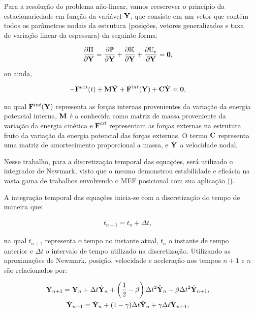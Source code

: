 Para a resolução do problema não-linear, vamos reescrever o princípio da estacionariedade em função da variável $\mathbf{Y}$, que consiste em um vetor que contém todos os parâmetros nodais da estrutura (posições, vetores generalizados e taxa de variação linear da espessura) da seguinte forma:

\begin{align}
	\frac{\partial\Pi}{\partial\mathbf{Y}} = \frac{\partial\mathbb{P}}{\partial \mathbf{Y}} + \frac{\partial\mathbb{K}}{\partial \mathbf{Y}} + \frac{\partial\mathbb{U}_e}{\partial \mathbf{Y}} = \mathbf{0},
\end{align}

\noindent ou ainda,

\begin{align}
	- \mathbf{F}^{ext}(t) + \mathbf{M}\ddot{\mathbf{Y}}_{}+ \mathbf{F}^{int}(\mathbf{Y}) + \mathbf{C}\dot{\mathbf{Y}}_{} = \mathbf{0}, \label{eq:equi_forma_matricial}
\end{align}

\noindent na qual $ \mathbf{F}^{int}(\mathbf{Y})$ representa as forças internas provenientes da variação da energia potencial interna, $\mathbf{M}$ é a conhecida como matriz de massa proveniente da variação da energia cinética e $\mathbf{F}^{ext}$ representam as forças externas na estrutura fruto da variação da energia potencial das forças externas. O termo $\mathbf{C}$ representa uma matriz de amortecimento proporcional a massa, e $\dot{\mathbf{Y}}_{}$ a velocidade nodal.

Nesse trabalho, para a discretização temporal das equações, será utilizado o integrador de Newmark, visto que o mesmo demonstrou estabilidade e eficácia na vasta gama de trabalhos envolvendo o MEF posicional com sua aplicação (\cite{CodaG:2004,CodaP:2010,CarrazedoC:2010,CodaP:2011,SanchesC:2016}).
  
A integração temporal das equações inicia-se com a discretização do tempo de maneira que:

\begin{align}
	t_{n+1} = t_{n} + \Delta t, \label{eq:disc_tempo}
\end{align}

\noindent na qual $t_{n+1}$ representa o tempo no instante atual, $t_{n}$ o instante de tempo anterior e  $\Delta t$ o intervalo de tempo utilizado na discretização. Utilizando as aproximações de Newmark, posição, velocidade e aceleração nos tempos $n+1$ e $n$ são relacionados por:

\begin{gather}
	\mathbf{Y}_{n+1}=\mathbf{Y}_{n} + \Delta t \dot{\mathbf{Y}}_{n}+\left(\frac{1}{2}-\beta\right) \Delta t^2 \ddot{\mathbf{Y}}_{n}+ \beta \Delta t^2 \ddot{\mathbf{Y}}_{n+1},\label{eq:newmark1}\\
	\dot{\mathbf{Y}}_{n+1} = \dot{\mathbf{Y}}_{n}+(1-\gamma)\Delta t \ddot{\mathbf{Y}}_{n}+\gamma \Delta t \ddot{\mathbf{Y}}_{n+1},\label{eq:newmark2}
\end{gather}

